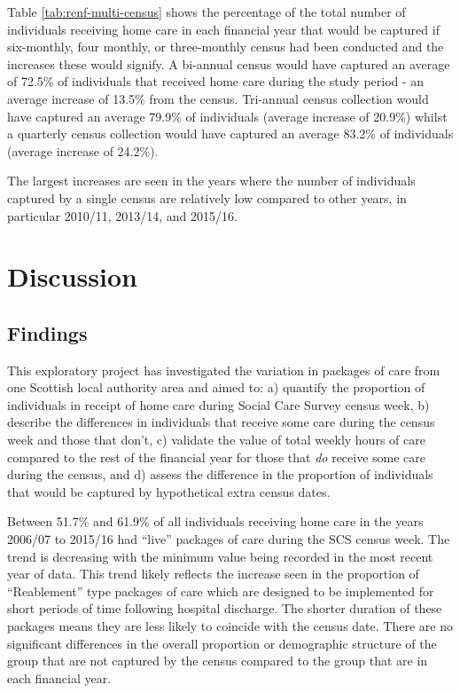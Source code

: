 \documentclass[]{article}
\begin{document}
Table \ref{tab:renf-multi-census} shows the percentage of the total
number of individuals receiving home care in each financial year that
would be captured if six-monthly, four monthly, or three-monthly census
had been conducted and the increases these would signify. A bi-annual
census would have captured an average of 72.5\% of individuals that
received home care during the study period - an average increase of
13.5\% from the census. Tri-annual census collection would have captured
an average 79.9\% of individuals (average increase of 20.9\%) whilst a
quarterly census collection would have captured an average 83.2\% of
individuals (average increase of 24.2\%).

The largest increases are seen in the years where the number of
individuals captured by a single census are relatively low compared to
other years, in particular 2010/11, 2013/14, and 2015/16.

\section{Discussion}\label{sec:renf-discuss}

\subsection{Findings}\label{subsec:renf-discuss-find}

This exploratory project has investigated the variation in packages of
care from one Scottish local authority area and aimed to: a) quantify
the proportion of individuals in receipt of home care during Social Care
Survey census week, b) describe the differences in individuals that
receive some care during the census week and those that don't, c)
validate the value of total weekly hours of care compared to the rest of
the financial year for those that \emph{do} receive some care during the
census, and d) assess the difference in the proportion of individuals
that would be captured by hypothetical extra census dates.

Between 51.7\% and 61.9\% of all individuals receiving home care in the
years 2006/07 to 2015/16 had ``live'' packages of care during the SCS
census week. The trend is decreasing with the minimum value being
recorded in the most recent year of data. This trend likely reflects the
increase seen in the proportion of ``Reablement'' type packages of care
which are designed to be implemented for short periods of time following
hospital discharge. The shorter duration of these packages means they
are less likely to coincide with the census date. There are no
significant differences in the overall proportion or demographic
structure of the group that are not captured by the census compared to
the group that are in each financial year.
\end{document}
